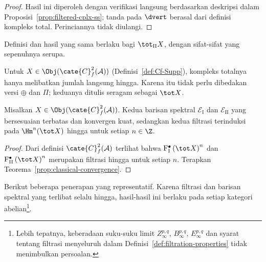 \begin{proof}
	Hasil ini diperoleh dengan verifikasi langsung berdasarkan deskripsi dalam
	Proposisi~\ref{prop:filtered-cplx-ss}; tanda pada $\dvert$ berasal dari
	definisi kompleks total. Perinciannya tidak diulangi.
\end{proof}

Definisi dan hasil yang sama berlaku bagi $\tot_{\Pi}X$, dengan sifat-sifat
yang sepenuhnya serupa.

Untuk $X\in\Obj(\cate{C}^2_f(\mathcal{A}))$
(Definisi~\ref{def:Cf-Supp}), kompleks totalnya hanya melibatkan jumlah
langsung hingga. Karena itu tidak perlu dibedakan versi $\oplus$ dan $\Pi$;
keduanya ditulis seragam sebagai $\tot X$.

\begin{theorem}\label{prop:tot-ss}
	Misalkan $X\in\Obj(\cate{C}^2_f(\mathcal{A}))$. Kedua barisan spektral
	$\mathscr{E}_{\mathrm{I}}$ dan $\mathscr{E}_{\mathrm{II}}$ yang
	bersesuaian terbatas dan konvergen kuat, sedangkan kedua filtrasi terinduksi
	pada $\Hm^n(\tot X)$ hingga untuk setiap $n\in\Z$.
\end{theorem}
\begin{proof}
	Dari definisi $\cate{C}^2_f(\mathcal{A})$ terlihat bahwa
	$\mathrm{F}_{\mathrm{I}}^\bullet\left(\tot X\right)^n$ dan
	$\mathrm{F}_{\mathrm{II}}^\bullet\left(\tot X\right)^n$ merupakan
	filtrasi hingga untuk setiap $n$. Terapkan
	Teorema~\ref{prop:classical-convergence}.
\end{proof}

Berikut beberapa penerapan yang representatif. Karena filtrasi dan barisan
spektral yang terlibat selalu hingga, hasil-hasil ini berlaku pada setiap
kategori abelian\footnote{Lebih tepatnya, keberadaan suku-suku limit
$Z_\infty^{p,q}$, $B_\infty^{p,q}$, $E_\infty^{p,q}$ dan syarat tentang
filtrasi menyeluruh dalam Definisi~\ref{def:filtration-properties} tidak
menimbulkan persoalan.}.

